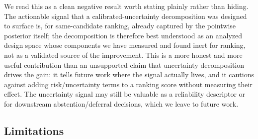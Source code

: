 We read this as a clean negative result worth stating plainly rather than
hiding. The actionable signal that a calibrated-uncertainty decomposition was
designed to surface is, for same-candidate ranking, already captured by the
pointwise posterior itself; the decomposition is therefore best understood as an
analyzed design space whose components we have measured and found inert for
ranking, not as a validated source of the improvement. This is a more honest
and more useful contribution than an unsupported claim that uncertainty
decomposition drives the gain: it tells future work where the signal actually
lives, and it cautions against adding risk/uncertainty terms to a ranking score
without measuring their effect. The uncertainty signal may still be valuable as
a reliability descriptor or for downstream abstention/deferral decisions, which
we leave to future work.

\subsection{Limitations}

